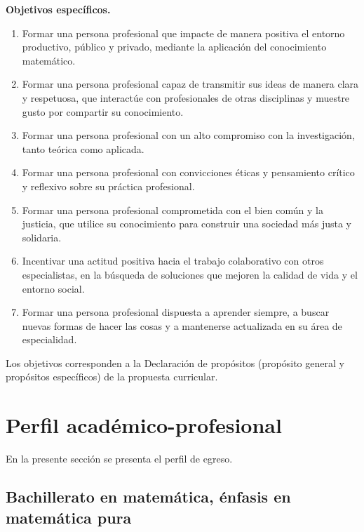 \documentclass[11pt,a4paper]{article}
\begin{document}
\textbf{Objetivos específicos.}
\begin{enumerate}
  \item Formar una persona profesional que impacte de manera positiva el entorno productivo, público y privado, mediante la aplicación del conocimiento matemático.
  \item Formar una persona profesional capaz de transmitir sus ideas de manera clara y respetuosa, que interactúe con profesionales de otras disciplinas y muestre gusto por compartir su conocimiento.
  \item Formar una persona profesional con un alto compromiso con la investigación, tanto teórica como aplicada.
  \item Formar una persona profesional con convicciones éticas y pensamiento crítico y reflexivo sobre su práctica profesional.
  \item Formar una persona profesional comprometida con el bien común y la justicia, que utilice su conocimiento para construir una sociedad más justa y solidaria.
  \item Incentivar una actitud positiva hacia el trabajo colaborativo con otros especialistas, en la búsqueda de soluciones que mejoren la calidad de vida y el entorno social.
  \item Formar una persona profesional dispuesta a aprender siempre, a buscar nuevas formas de hacer las cosas y a mantenerse actualizada en su área de especialidad.
\end{enumerate}

{\footnotesize Los objetivos corresponden a la Declaración de propósitos (propósito general y propósitos específicos) de la propuesta curricular.\par}

\section{Perfil académico-profesional}

En la presente sección se presenta el perfil de egreso.


\subsection*{Bachillerato en matemática, énfasis en matemática pura}
\end{document}
